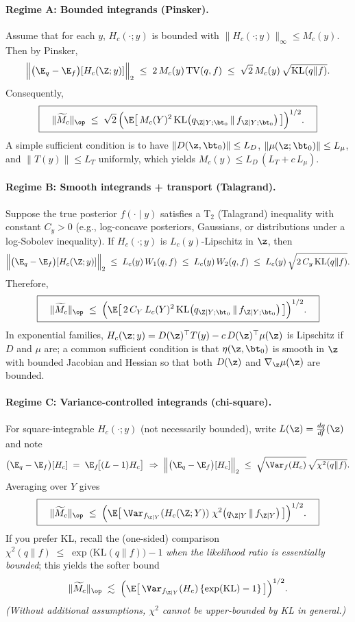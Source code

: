 \paragraph{Regime A: Bounded integrands (Pinsker).}
Assume that for each $y$, $H_c(\cdot;y)$ is bounded with $\|H_c(\cdot;y)\|_{\infty}\le M_c(y)$. Then by Pinsker,
\[
\Big\|\big(\E_q-\E_f\big)[H_c(\Z;y)]\Big\|_2 \;\le\; 2\,M_c(y)\, \mathrm{TV}(q,f)
\;\le\; \sqrt{2}\,M_c(y)\,\sqrt{ \mathrm{KL}(q\|f)}.
\]
Consequently,
\[
\boxed{\quad
\|\widetilde M_c\|_{\op} \;\le\; 
\sqrt{2}\,\Big( \E\big[\,M_c(Y)^2\,\mathrm{KL}\big(q_{\Z|Y;\bt_0}\,\|\,f_{\Z|Y;\bt_0}\big)\,\big]\Big)^{1/2}.
\quad}
\]
A simple sufficient condition is to have $\|D(\z,\bt_0)\|\le L_D$, $\|\mu(\z;\bt_0)\|\le L_\mu$, and $\|T(y)\|\le L_T$ uniformly, which yields $M_c(y)\le L_D\,(L_T + c\,L_\mu)$.

\paragraph{Regime B: Smooth integrands + transport (Talagrand).}
Suppose the true posterior $f(\cdot\mid y)$ satisfies a T$_2$ (Talagrand) inequality with constant $C_y>0$
(e.g., log-concave posteriors, Gaussians, or distributions under a log-Sobolev inequality). 
If $H_c(\cdot;y)$ is $L_c(y)$-Lipschitz in $\z$, then
\[
\Big\|\big(\E_q-\E_f\big)[H_c(\Z;y)]\Big\|_2 \;\le\; L_c(y)\, W_1(q,f) \;\le\; L_c(y)\, W_2(q,f)
\;\le\; L_c(y)\,\sqrt{2\,C_y\,\mathrm{KL}(q\|f)}.
\]
Therefore,
\[
\boxed{\quad
\|\widetilde M_c\|_{\op} \;\le\; 
\Big(\E\big[\, 2\,C_Y\,L_c(Y)^2\,\mathrm{KL}\big(q_{\Z|Y;\bt_0}\,\|\,f_{\Z|Y;\bt_0}\big)\,\big]\Big)^{1/2}.
\quad}
\]
In exponential families, $H_c(\z;y)=D(\z)^\top T(y)-c\,D(\z)^\top\mu(\z)$ is Lipschitz if $D$ and $\mu$ are; a common sufficient condition is that $\eta(\z,\bt_0)$ is smooth in $\z$ with bounded Jacobian and Hessian so that both $D(\z)$ and $\nabla_\z\mu(\z)$ are bounded.

\paragraph{Regime C: Variance-controlled integrands (chi-square).}
For square-integrable $H_c(\cdot;y)$ (not necessarily bounded), write 
$L(\z)=\frac{dq}{df}(\z)$ and note
\[
\big(\E_q-\E_f\big)[H_c] \;=\; \E_f\!\big[(L-1)H_c\big]
\ \Rightarrow\ 
\Big\|\big(\E_q-\E_f\big)[H_c]\Big\|_2 \;\le\; \sqrt{\Var_f(H_c)}\,\sqrt{\chi^2(q\|f)}.
\]
Averaging over $Y$ gives
\[
\boxed{\quad
\|\widetilde M_c\|_{\op} \;\le\; 
\Big(\E\big[\,\Var_{f_{\Z|Y}}(H_c(\Z;Y))\;\chi^2\big(q_{\Z|Y}\,\|\,f_{\Z|Y}\big)\,\big]\Big)^{1/2}.
\quad}
\]
If you prefer KL, recall the (one-sided) comparison 
$\chi^2(q\|f)\;\le\; \exp\!\big( \mathrm{KL}(q\|f)\big)-1$ \emph{when the likelihood ratio is essentially bounded}; this yields the softer bound
\[
\|\widetilde M_c\|_{\op} \;\lesssim\; 
\Big(\E\big[\,\Var_{f_{\Z|Y}}(H_c)\,\{\exp(\mathrm{KL})-1\}\,\big]\Big)^{1/2}.
\]
\emph{(Without additional assumptions, $\chi^2$ cannot be upper-bounded by KL in general.)}
\medskip

